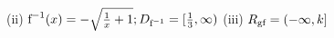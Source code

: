 \item (ii) $\text{f}^{-1}(x)=-\sqrt{\frac{1}{x}+1};\text{\ensuremath{D_{\text{f}^{-1}}}}=[\frac{1}{3},\infty)$
(iii) $\text{\ensuremath{R_{\text{gf} }}}=(-\infty,k]$